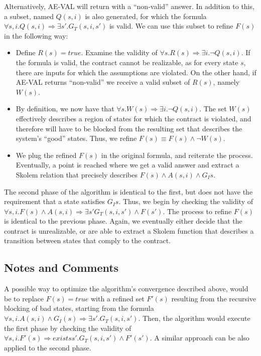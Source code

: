 \documentclass{article}
\begin{document}
Alternatively, AE-VAL will return with a ``non-valid'' answer. In addition to
this, a subset, named $Q(s,i)$ is also generated, for which the formula
$\forall s,i. Q(s,i) \Rightarrow \exists s'. G_{T}(s,i,s')$ is valid.
We can use this subset to refine $F(s)$ in the following way:

\begin{itemize}
  \item Define $R(s) = true$. Examine the validity of $\forall s. R(s)
  \Rightarrow \exists i. \lnot Q(s,i)$. If the formula is valid, the
  contract cannot be realizable, as for every state $s$, there are inputs for
  which the assumptions are violated. On the other hand, if AE-VAL returns ``non-valid'' we receive
  a valid subset of $R(s)$, namely $W(s)$.
  \item By definition, we now have that $\forall s. W(s) \Rightarrow \exists i.
  \lnot Q(s,i)$. The set $W(s)$ effectively describes a region of states for
  which the contract is violated, and therefore will have to be blocked from the
  resulting set that describes the system's ``good'' states. Thus, we refine
  $F(s) \equiv F(s) \land \lnot W(s)$.
  \item We plug the refined $F(s)$ in the original formula, and reiterate the
  process. Eventually, a point is reached where we get a valid answer and
  extract a Skolem relation that precisely describes $F(s) \land A(s,i) \land
  G_I{s}$.
\end{itemize}

The second phase of the algorithm is identical to the first, but does not have
the requirement that a state satisfies $G_I{s}$. Thus, we begin by checking the
validity of $\forall s,i. F(s) \land A(s,i) \Rightarrow \exists s'
G_{T}(s,i,s') \land F(s')$. The process to refine $F(s)$ is identical to the
previous phase. Again, we eventually either decide that the contract is
unrealizable, or are able to extract a Skolem function that describes a
transition between states that comply to the contract.


\subsection{Notes and Comments}

A possible way to optimize the algorithm's convergence described above, would be
to replace $F(s) = true$ with a refined set $F'(s)$ resulting from the recursive
blocking of bad states, starting from the formula $\forall s,i. A(s,i) \land G_I(s) \Rightarrow
\exists s'. G_T(s,i,s')$. Then, the algorithm would execute the first phase by
checking the validity of $\forall s,i. F'(s) \Rightarrow exists s'.
G_{T}(s,i,s') \land F'(s')$. A similar approach can be also applied to the
second phase.
\end{document}
